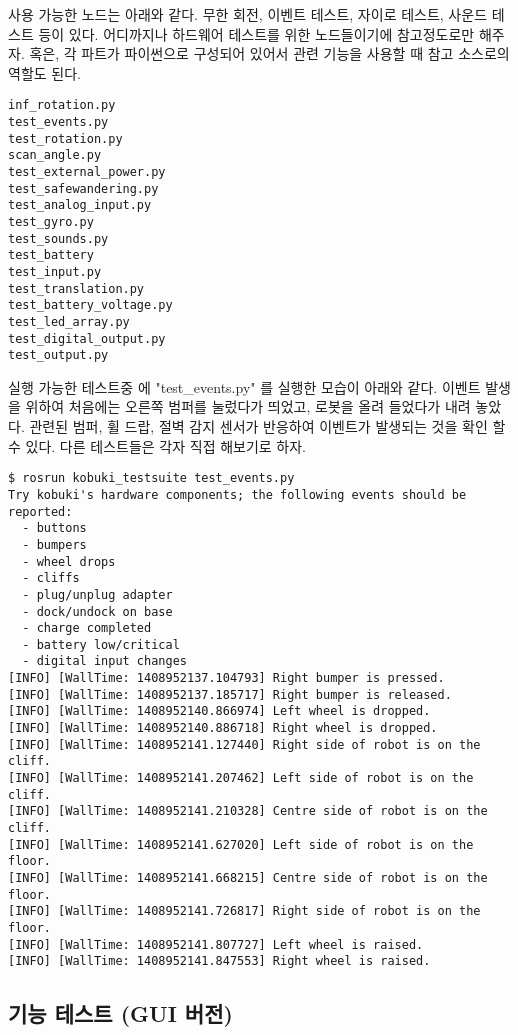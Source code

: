사용 가능한 노드는 아래와 같다. 무한 회전, 이벤트 테스트, 자이로 테스트, 사운드 테스트 등이 있다. 어디까지나 하드웨어 테스트를 위한 노드들이기에 참고정도로만 해주자. 혹은, 각 파트가 파이썬으로 구성되어 있어서 관련 기능을 사용할 때 참고 소스로의 역할도 된다.

\vspace{\baselineskip}
\begin{lstlisting}[language=ROS]
inf_rotation.py
test_events.py
test_rotation.py
scan_angle.py
test_external_power.py
test_safewandering.py
test_analog_input.py
test_gyro.py
test_sounds.py
test_battery
test_input.py
test_translation.py
test_battery_voltage.py
test_led_array.py
test_digital_output.py
test_output.py 
\end{lstlisting}


실행 가능한 테스트중 에 "test\_events.py" 를 실행한 모습이 아래와 같다. 이벤트 발생을 위하여 처음에는 오른쪽 범퍼를 눌렀다가 띄었고, 로봇을 올려 들었다가 내려 놓았다. 관련된 범퍼, 휠 드랍, 절벽 감지 센서가 반응하여 이벤트가 발생되는 것을 확인 할 수 있다. 다른 테스트들은 각자 직접 해보기로 하자.

\vspace{\baselineskip}
\begin{lstlisting}[language=ROS]
$ rosrun kobuki_testsuite test_events.py
Try kobuki's hardware components; the following events should be reported:
  - buttons
  - bumpers
  - wheel drops
  - cliffs
  - plug/unplug adapter
  - dock/undock on base
  - charge completed
  - battery low/critical
  - digital input changes
[INFO] [WallTime: 1408952137.104793] Right bumper is pressed.
[INFO] [WallTime: 1408952137.185717] Right bumper is released.
[INFO] [WallTime: 1408952140.866974] Left wheel is dropped.
[INFO] [WallTime: 1408952140.886718] Right wheel is dropped.
[INFO] [WallTime: 1408952141.127440] Right side of robot is on the cliff.
[INFO] [WallTime: 1408952141.207462] Left side of robot is on the cliff.
[INFO] [WallTime: 1408952141.210328] Centre side of robot is on the cliff.
[INFO] [WallTime: 1408952141.627020] Left side of robot is on the floor.
[INFO] [WallTime: 1408952141.668215] Centre side of robot is on the floor.
[INFO] [WallTime: 1408952141.726817] Right side of robot is on the floor.
[INFO] [WallTime: 1408952141.807727] Left wheel is raised.
[INFO] [WallTime: 1408952141.847553] Right wheel is raised.
\end{lstlisting}

\subsection{기능 테스트 (GUI 버전)}

